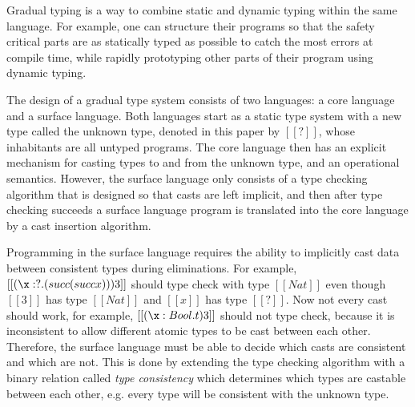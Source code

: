 
Gradual typing \cite{Siek:2006,Siek:2015} is a way to combine static
and dynamic typing within the same language.  For example, one can
structure their programs so that the safety critical parts are as
statically typed as possible to catch the most errors at compile time,
while rapidly prototyping other parts of their program using dynamic
typing.

The design of a gradual type system consists of two languages: a core
language and a surface language.  Both languages start as a static
type system with a new type called the unknown type, denoted in this
paper by $[[?]]$, whose inhabitants are all untyped programs.  The
core language then has an explicit mechanism for casting types to and
from the unknown type, and an operational semantics.  However, the
surface language only consists of a type checking algorithm that is
designed so that casts are left implicit, and then after type checking
succeeds a surface language program is translated into the core
language by a cast insertion algorithm.

Programming in the surface language requires the ability to implicitly
cast data between consistent types during eliminations. For example,
$[[(\x:?.(succ (succ x))) 3]]$ should type check with type $[[Nat]]$
even though $[[3]]$ has type $[[Nat]]$ and $[[x]]$ has type
$[[?]]$. Now not every cast should work, for example, $[[(\x:Bool.t)
    3]]$ should not type check, because it is inconsistent to allow
different atomic types to be cast between each other.  Therefore, the
surface language must be able to decide which casts are consistent and
which are not.  This is done by extending the type checking algorithm
with a binary relation called \emph{type consistency} which determines
which types are castable between each other, e.g. every type will be
consistent with the unknown type.

